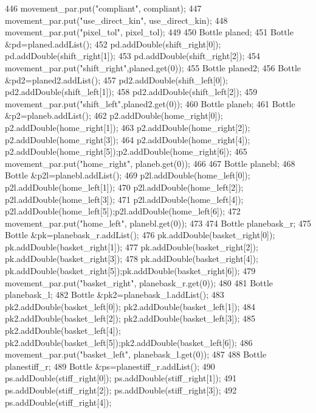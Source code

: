 \begin{DoxyCode}
446     movement\_par.put(\textcolor{stringliteral}{"compliant"}, compliant);
447     movement\_par.put(\textcolor{stringliteral}{"use\_direct\_kin"}, use\_direct\_kin);
448     movement\_par.put(\textcolor{stringliteral}{"pixel\_tol"}, pixel\_tol);
449 
450     Bottle planed;
451     Bottle &pd=planed.addList();
452     pd.addDouble(shift\_right[0]); pd.addDouble(shift\_right[1]);
453     pd.addDouble(shift\_right[2]);
454     movement\_par.put(\textcolor{stringliteral}{"shift\_right"},planed.get(0));
455     Bottle planed2;
456     Bottle &pd2=planed2.addList();
457     pd2.addDouble(shift\_left[0]); pd2.addDouble(shift\_left[1]);
458     pd2.addDouble(shift\_left[2]);
459     movement\_par.put(\textcolor{stringliteral}{"shift\_left"},planed2.get(0));
460     Bottle planeb;
461     Bottle &p2=planeb.addList();
462     p2.addDouble(home\_right[0]); p2.addDouble(home\_right[1]);
463     p2.addDouble(home\_right[2]); p2.addDouble(home\_right[3]);
464     p2.addDouble(home\_right[4]); p2.addDouble(home\_right[5]);p2.addDouble(home\_right[6]);
465     movement\_par.put(\textcolor{stringliteral}{"home\_right"}, planeb.get(0));
466 
467     Bottle planebl;
468     Bottle &p2l=planebl.addList();
469     p2l.addDouble(home\_left[0]); p2l.addDouble(home\_left[1]);
470     p2l.addDouble(home\_left[2]); p2l.addDouble(home\_left[3]);
471     p2l.addDouble(home\_left[4]); p2l.addDouble(home\_left[5]);p2l.addDouble(home\_left[6]);
472     movement\_par.put(\textcolor{stringliteral}{"home\_left"}, planebl.get(0));
473 
474     Bottle planebask\_r;
475     Bottle &pk=planebask\_r.addList();
476     pk.addDouble(basket\_right[0]); pk.addDouble(basket\_right[1]);
477     pk.addDouble(basket\_right[2]); pk.addDouble(basket\_right[3]);
478     pk.addDouble(basket\_right[4]); pk.addDouble(basket\_right[5]);pk.addDouble(basket\_right[6]);
479     movement\_par.put(\textcolor{stringliteral}{"basket\_right"}, planebask\_r.get(0));
480 
481     Bottle planebask\_l;
482     Bottle &pk2=planebask\_l.addList();
483     pk2.addDouble(basket\_left[0]); pk2.addDouble(basket\_left[1]);
484     pk2.addDouble(basket\_left[2]); pk2.addDouble(basket\_left[3]);
485     pk2.addDouble(basket\_left[4]); pk2.addDouble(basket\_left[5]);pk2.addDouble(basket\_left[6]);
486     movement\_par.put(\textcolor{stringliteral}{"basket\_left"}, planebask\_l.get(0));
487 
488     Bottle planestiff\_r;
489     Bottle &ps=planestiff\_r.addList();
490     ps.addDouble(stiff\_right[0]); ps.addDouble(stiff\_right[1]);
491     ps.addDouble(stiff\_right[2]); ps.addDouble(stiff\_right[3]);
492     ps.addDouble(stiff\_right[4]);

\end{DoxyCode}
